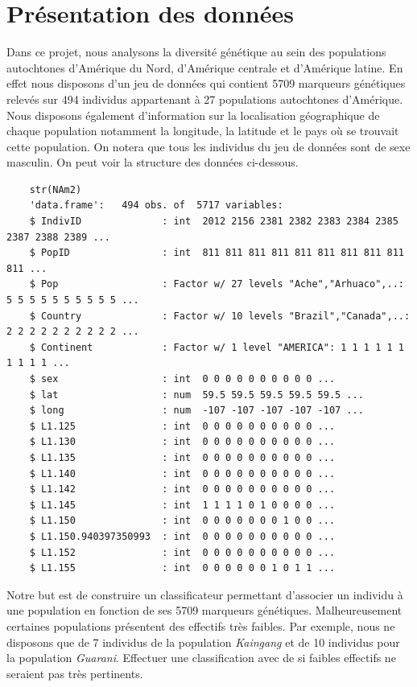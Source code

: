 \documentclass[12pt,a4paper]{article}
\begin{document}
\section{Présentation des données}
\noindent Dans ce projet, nous analysons la diversité génétique au sein des populations autochtones d'Amérique du Nord, d'Amérique centrale et d'Amérique latine. En effet nous disposons d'un jeu de données qui contient 5709 marqueurs génétiques relevés sur 494 individus appartenant à 27 populations autochtones d'Amérique. Nous disposons également d'information sur la localisation géographique de chaque population notamment la longitude, la latitude et le pays où se trouvait cette population. On notera que tous les individus du jeu de données sont de sexe masculin. On peut voir la structure des données ci-dessous.\vspace{2mm}
\begin{lstlisting}
	str(NAm2)
	'data.frame':	494 obs. of  5717 variables:
	$ IndivID              : int  2012 2156 2381 2382 2383 2384 2385 2387 2388 2389 ...
	$ PopID                : int  811 811 811 811 811 811 811 811 811 811 ...
	$ Pop                  : Factor w/ 27 levels "Ache","Arhuaco",..: 5 5 5 5 5 5 5 5 5 5 ...
	$ Country              : Factor w/ 10 levels "Brazil","Canada",..: 2 2 2 2 2 2 2 2 2 2 ...
	$ Continent            : Factor w/ 1 level "AMERICA": 1 1 1 1 1 1 1 1 1 1 ...
	$ sex                  : int  0 0 0 0 0 0 0 0 0 0 ...
	$ lat                  : num  59.5 59.5 59.5 59.5 59.5 ...
	$ long                 : num  -107 -107 -107 -107 -107 ...
	$ L1.125               : int  0 0 0 0 0 0 0 0 0 0 ...
	$ L1.130               : int  0 0 0 0 0 0 0 0 0 0 ...
	$ L1.135               : int  0 0 0 0 0 0 0 0 0 0 ...
	$ L1.140               : int  0 0 0 0 0 0 0 0 0 0 ...
	$ L1.142               : int  0 0 0 0 0 0 0 0 0 0 ...
	$ L1.145               : int  1 1 1 1 0 1 0 0 0 0 ...
	$ L1.150               : int  0 0 0 0 0 0 0 1 0 0 ...
	$ L1.150.940397350993  : int  0 0 0 0 0 0 0 0 0 0 ...
	$ L1.152               : int  0 0 0 0 0 0 0 0 0 0 ...
	$ L1.155               : int  0 0 0 0 0 0 1 0 1 1 ...
\end{lstlisting}
Notre but est de construire un classificateur permettant d'associer un individu à une population en fonction de ses 5709 marqueurs génétiques. Malheureusement certaines populations présentent des effectifs très faibles. Par exemple, nous ne disposons que de 7 individus de la population \textit{Kaingang} et de 10 individus pour la population \textit{Guarani}. Effectuer une classification avec de si faibles effectifs ne seraient pas très pertinents.\vspace{2mm}
\end{document}
